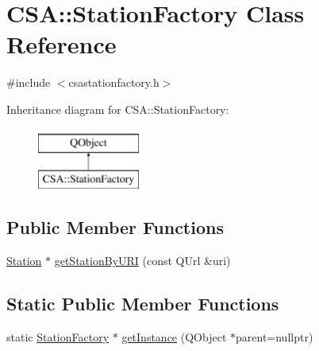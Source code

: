 \hypertarget{classCSA_1_1StationFactory}{}\section{C\+SA\+:\+:Station\+Factory Class Reference}
\label{classCSA_1_1StationFactory}


{\ttfamily \#include $<$csastationfactory.\+h$>$}

Inheritance diagram for C\+SA\+:\+:Station\+Factory\+:\begin{figure}[H]
\begin{center}
\leavevmode
\includegraphics[height=2.000000cm]{classCSA_1_1StationFactory}
\end{center}
\end{figure}
\subsection*{Public Member Functions}
\begin{DoxyCompactItemize}
\item 
\mbox{\hyperlink{classCSA_1_1Station}{Station}} $\ast$ \mbox{\hyperlink{classCSA_1_1StationFactory_ac2abd919e955f56a2c7a2cdba6198160}{get\+Station\+By\+U\+RI}} (const Q\+Url \&uri)
\end{DoxyCompactItemize}
\subsection*{Static Public Member Functions}
\begin{DoxyCompactItemize}
\item 
static \mbox{\hyperlink{classCSA_1_1StationFactory}{Station\+Factory}} $\ast$ \mbox{\hyperlink{classCSA_1_1StationFactory_a445c2886c5ee20b1d86f0d5ed132a53f}{get\+Instance}} (Q\+Object $\ast$parent=nullptr)
\end{DoxyCompactItemize}
